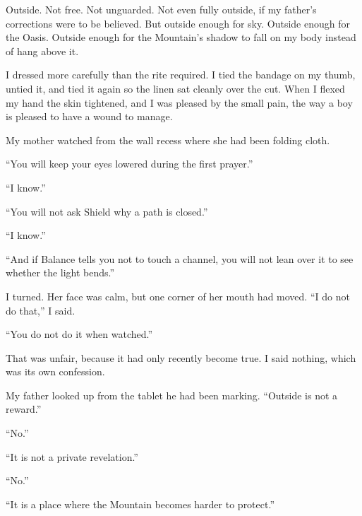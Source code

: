 Outside. Not free. Not unguarded. Not even fully outside, if my father's corrections were to be believed. But outside enough for sky. Outside enough for the Oasis. Outside enough for the Mountain's shadow to fall on my body instead of hang above it.\par

I dressed more carefully than the rite required. I tied the bandage on my thumb, untied it, and tied it again so the linen sat cleanly over the cut. When I flexed my hand the skin tightened, and I was pleased by the small pain, the way a boy is pleased to have a wound to manage.\par

My mother watched from the wall recess where she had been folding cloth.\par

``You will keep your eyes lowered during the first prayer.''\par

``I know.''\par

``You will not ask Shield why a path is closed.''\par

``I know.''\par

``And if Balance tells you not to touch a channel, you will not lean over it to see whether the light bends.''\par

I turned. Her face was calm, but one corner of her mouth had moved. ``I do not do that,'' I said.\par

``You do not do it when watched.''\par

That was unfair, because it had only recently become true. I said nothing, which was its own confession.\par

My father looked up from the tablet he had been marking. ``Outside is not a reward.''\par

``No.''\par

``It is not a private revelation.''\par

``No.''\par

``It is a place where the Mountain becomes harder to protect.''\par

